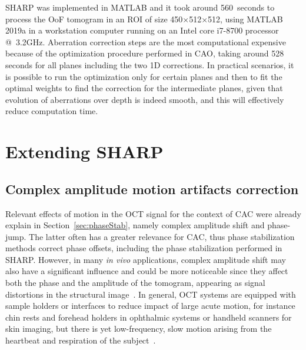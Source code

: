 SHARP was implemented in MATLAB and it took around 560~seconds to process the OoF tomogram in an ROI of size 450$\times$512$\times$512, using MATLAB 2019a in a workstation computer running on an Intel core i7-8700 processor @~3.2GHz. Aberration correction steps are the most computational expensive because of the optimization procedure performed in CAO, taking around 528 seconds for all planes including the two 1D corrections. In practical scenarios, it is possible to run the optimization only for certain planes and then to fit the optimal weights to find the correction for the intermediate planes, given that evolution of aberrations over depth is indeed smooth, and this will effectively reduce computation time.

\FloatBarrier

\section{Extending SHARP}\label{sec:Extensions}

\subsection{Complex amplitude motion artifacts correction}\label{sec:MotionCor}

Relevant effects of motion in the OCT signal for the context of CAC were already explain in Section~\ref{sec:phaseStab}, namely complex amplitude shift and phase-jump. The latter often has a greater relevance for CAC, thus phase stabilization methods correct phase offsets, including the phase stabilization performed in SHARP. However, in many \textit{in vivo} applications, complex amplitude shift may also have a significant influence and could be more noticeable since they affect both the phase and the amplitude of the tomogram, appearing as signal distortions in the structural image~\cite{Kraus2015_OCT}. In general, OCT systems are equipped with sample holders or interfaces to reduce impact of large acute motion, for instance chin rests and forehead holders in ophthalmic systems or handheld scanners for skin imaging, but there is yet low-frequency, slow motion arising from the heartbeat and respiration of the subject~\cite{Kraus2015_OCT}.

